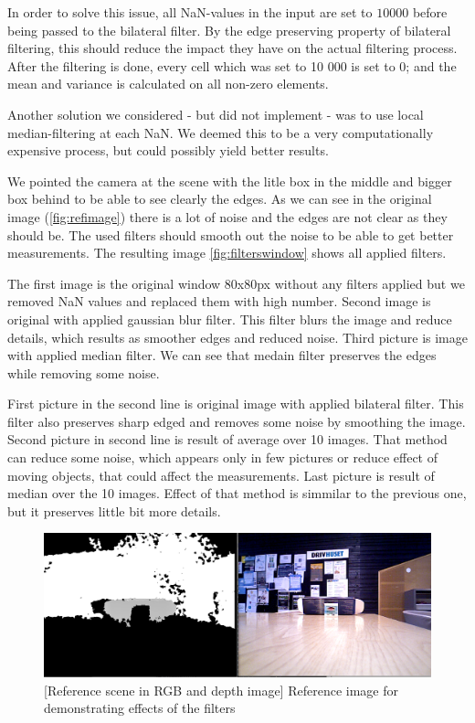 \documentclass[11pt]{article}
\begin{document}
In order to solve this issue, all NaN-values in the input are set to $10000$ before being passed to the bilateral filter. By the edge preserving property of bilateral filtering, this should reduce the impact they have on the actual filtering process. After the filtering is done, every cell which was set to 10 000 is set to 0; and the mean and variance is calculated on all non-zero elements. \par
Another solution we considered - but did not implement - was to use local median-filtering at each NaN. We deemed this to be a very computationally expensive process, but could possibly yield better results. \par
We pointed the camera at the scene with the litle box in the middle and bigger box behind to be able to see clearly the edges. As we can see in the original image (\vref{fig:refimage}) there is a lot of noise and the edges are not clear as they should be. The used filters should smooth out the noise to be able to get better measurements. The resulting image \vref{fig:filterswindow} shows all applied filters. \par
The first image is the original window 80x80px without any filters applied but we removed NaN values and replaced them with high number. Second image is original with applied gaussian blur filter. This filter blurs the image and reduce details, which results as smoother edges and reduced noise. Third picture is image with applied median filter. We can see that medain filter preserves the edges while removing some noise. \par
First picture in the second line is original image with applied bilateral filter. This filter also preserves sharp edged and removes some noise by smoothing the image. Second picture in second line is result of average over 10 images. That method can reduce some noise, which appears only in few pictures or reduce effect of moving objects, that could affect the measurements. Last picture is result of median over the 10 images. Effect of that method is simmilar to the previous one, but it preserves little bit more details. 
\begin{figure}[ht]
  \centering
  \includegraphics[width=1\textwidth]{figures/reference_rgb_depth.png}
  [Reference scene in RGB and depth image]{\label{fig:refimage} Reference image for demonstrating effects of the filters}
\end{figure}
\end{document}
